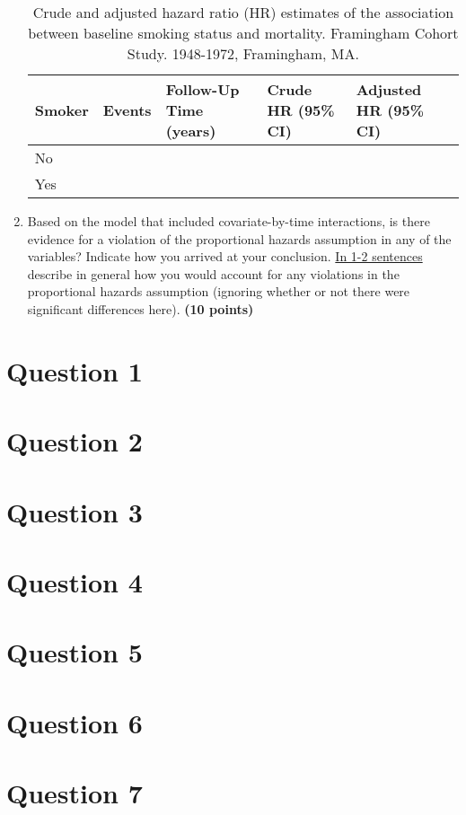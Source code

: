 \documentclass{article}\usepackage[]{graphicx}\usepackage[]{color}
\begin{document}
\begin{enumerate}
\begin{table}[H]
\centering
\parbox{10cm}{\caption{Crude and adjusted hazard ratio (HR) estimates of the association between baseline smoking status and mortality. Framingham Cohort Study. 1948-1972, Framingham, MA.}} 
\begin{tabular}{lllll}
  \hline
Smoker & Events & Follow-Up Time (years) & Crude HR (95\% CI) & Adjusted HR (95\% CI) \\ 
  \hline
No &  &  &  &  \\ 
  Yes &  &  &  &  \\ 
   \hline
\end{tabular}
\end{table}

  
  \item Based on the model that included covariate-by-time interactions, is there evidence for a violation of the proportional hazards assumption in any of the variables? Indicate how you arrived at your conclusion. \ul{In 1-2 sentences} describe in general how you would account for any violations in the proportional hazards assumption (ignoring whether or not there were significant differences here). \textbf{(10 points)}
\end{enumerate}

\pagebreak

\section*{Question 1}

\pagebreak

\section*{Question 2}

\pagebreak

\section*{Question 3}

\pagebreak

\section*{Question 4}

\pagebreak

\section*{Question 5}

\pagebreak

\section*{Question 6}

\pagebreak

\section*{Question 7}
\end{document}
